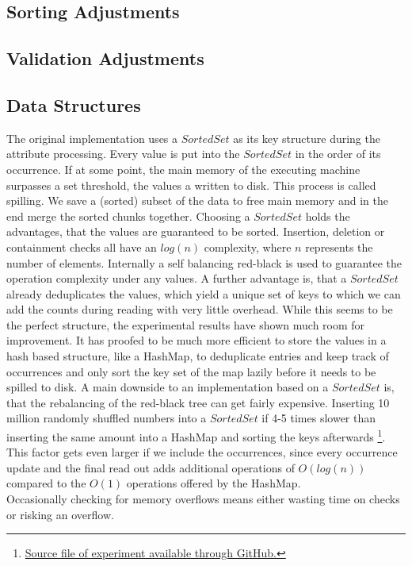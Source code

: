 \subsection{Sorting Adjustments}

\subsection{Validation Adjustments}


\subsection{Data Structures}
The original implementation uses a $SortedSet$ as its key structure during the attribute processing. Every value is put into the $SortedSet$ in the order of its occurrence. If at some point, the main memory of the executing machine surpasses a set threshold, the values a written to disk. This process is called spilling. We save a (sorted) subset of the data to free main memory and in the end merge the sorted chunks together. Choosing a $SortedSet$ holds the advantages, that the values are guaranteed to be sorted. Insertion, deletion or containment checks all have an $log(n)$ complexity, where $n$ represents the number of elements. Internally a self balancing red-black is used to guarantee the operation complexity under any values. A further advantage is, that a $SortedSet$ already deduplicates the values, which yield a unique set of keys to which we can add the counts during reading with very little overhead.
While this seems to be the perfect structure, the experimental results have shown much room for improvement. It has proofed to be much more efficient to store the values in a hash based structure, like a HashMap, to deduplicate entries and keep track of occurrences and only sort the key set of the map lazily before it needs to be spilled to disk. A main downside to an implementation based on a $SortedSet$ is, that the rebalancing of the red-black tree can get fairly expensive. Inserting 10 million randomly shuffled numbers into a $SortedSet$ if 4-5 times slower than inserting the same amount into a HashMap and sorting the keys afterwards \footnote{\href{https://github.com/Jakob-L-M/partial-inclusion-dependencies/blob/main/experiments/src/DataStructures.java}{Source file of experiment available through GitHub.}}. This factor gets even larger if we include the occurrences, since every occurrence update and the final read out adds additional operations of $O(log(n))$ compared to the $O(1)$ operations offered by the HashMap. \\

\noindent
Occasionally checking for memory overflows means either wasting time on checks or risking an overflow.
